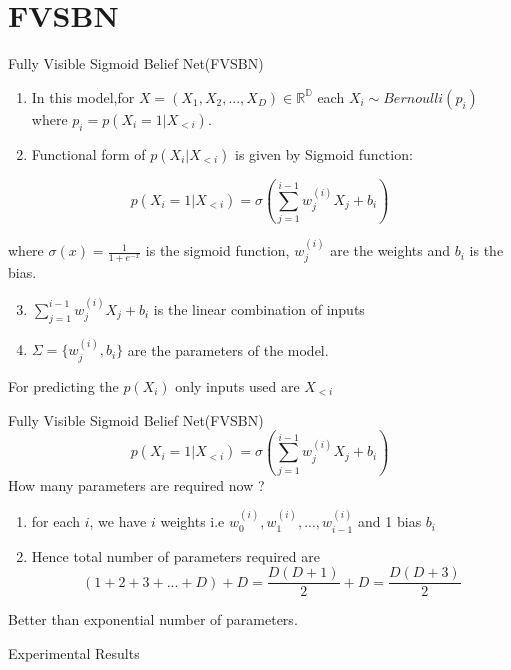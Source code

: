 \section*{FVSBN}
\begin{frame}{Fully Visible Sigmoid Belief Net(FVSBN)}
    \begin{enumerate}
        \item In this model,for $X=(X_1,X_2,...,X_D) \in \mathbb{R^{D}}$ each $X_i \sim Bernoulli(p_i)$ where $p_i = p(X_i=1|X_{<i})$.
        \item Functional form of $p(X_i|X_{<i})$ is given by Sigmoid function:
    \end{enumerate}

    \[\boxed{p(X_i=1|X_{<i}) = \sigma(\sum_{j=1}^{i-1} w^{(i)}_{j}X_j + b_i)}\]

    where $\sigma(x) = \frac{1}{1+e^{-x}}$ is the sigmoid function, $w^{(i)}_{j}$ are the weights and $b_i$ is the bias. \\

    \begin{enumerate}
        \setcounter{enumi}{2}
        \item $\sum_{j=1}^{i-1} w^{(i)}_{j}X_j + b_i$ is the linear combination of inputs
        \item $\Sigma = \{w^{(i)}_{j},b_i\}$ are the parameters of the model.
    \end{enumerate}
    \bigskip

    For predicting the $p(X_i)$ only inputs used are $X_{<i}$
\end{frame}

\begin{frame}{Fully Visible Sigmoid Belief Net(FVSBN)}
    \[\boxed{p(X_i=1|X_{<i}) = \sigma(\sum_{j=1}^{i-1} w^{(i)}_{j}X_j + b_i)}\]
    How many parameters are required now ? \\

    \begin{enumerate}
        \item for each $i$, we have $i$ weights i.e $w^{(i)}_0, w^{(i)}_1,...,w^{(i)}_{i-1}$ and 1 bias $b_i$
        \item Hence total number of parameters required are \[\boxed{(1+2+3+...+D) + D = \frac{D(D+1)}{2} + D = \frac{D(D+3)}{2}}\]
    \end{enumerate}

    Better than exponential number of parameters.
\end{frame}

\begin{frame}{Experimental Results}
    
\end{frame}